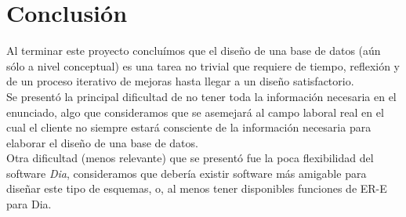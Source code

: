 \documentclass[]{report}
\begin{document}
	
	
	\chapter*{Conclusión}\large
	\begin{adjustwidth}{16pt}{16pt} \large
		
	\hspace{1.5em}Al terminar este proyecto concluímos que el diseño de una base de datos (aún sólo a nivel conceptual) es una tarea no trivial que requiere de tiempo, reflexión y de un proceso iterativo de mejoras hasta llegar a un diseño satisfactorio.\\

	Se presentó la principal dificultad de no tener toda la información necesaria en el enunciado, algo que consideramos que se asemejará al campo laboral real en el cual el cliente no siempre estará consciente de la información necesaria para elaborar el diseño de una base de datos.\\
	
	Otra dificultad (menos relevante) que se presentó fue la poca flexibilidad del software \emph{Dia}, consideramos que debería existir software más amigable para diseñar este tipo de esquemas, o, al menos tener disponibles funciones de ER-E para Dia.
	\end{adjustwidth}
\end{document}
